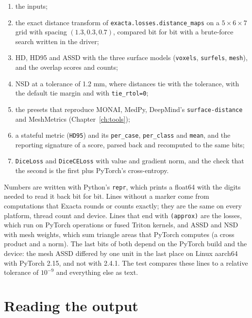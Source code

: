 \begin{enumerate}[nosep]
\item the inputs;
\item the exact distance transform of \texttt{exacta.losses.distance\_maps} on a
  $5\times6\times7$ grid with spacing $(1.3,0.3,0.7)$, compared bit for bit with a brute-force
  search written in the driver;
\item HD, HD95 and ASSD with the three surface models (\texttt{voxels}, \texttt{surfels},
  \texttt{mesh}), and the overlap scores and counts;
\item NSD at a tolerance of 1.2 mm, where distances tie with the tolerance, with the default tie
  margin and with \texttt{tie\_rtol=0};
\item the presets that reproduce MONAI, MedPy, DeepMind's \texttt{surface-distance} and
  MeshMetrics (Chapter~\ref{ch:tools});
\item a stateful metric (\texttt{HD95}) and its \texttt{per\_case}, \texttt{per\_class} and
  \texttt{mean}, and the reporting signature of a score, parsed back and recomputed to the
  same bits;
\item \texttt{DiceLoss} and \texttt{DiceCELoss} with value and gradient norm, and the check that
  the second is the first plus PyTorch's cross-entropy.
\end{enumerate}

Numbers are written with Python's \texttt{repr}, which prints a float64 with the digits needed to
read it back bit for bit. Lines without a marker come from computations that Exacta rounds or
counts exactly; they are the same on every platform, thread count and device. Lines that end
with \texttt{(approx)} are the losses, which run on PyTorch operations or fused Triton kernels, and
ASSD and NSD with mesh weights, which sum triangle areas that PyTorch computes (a cross product
and a norm). The last bits of both depend on the PyTorch build and the device: the mesh ASSD
differed by one unit in the last place on Linux aarch64 with PyTorch 2.15, and not with 2.4.1.
The test compares these lines to a relative tolerance of $10^{-9}$ and everything else as text.

\section{Reading the output}\label{driver:reading}

